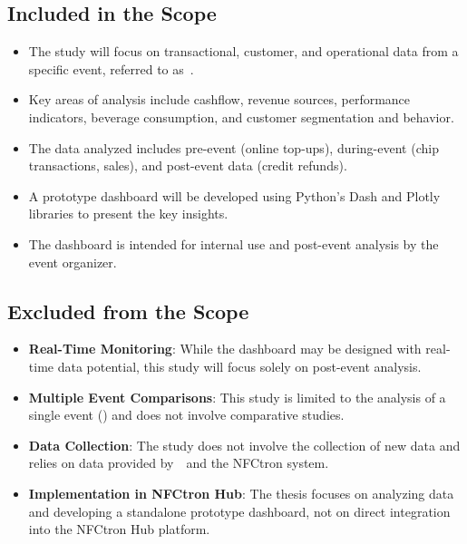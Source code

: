 \subsection*{Included in the Scope}
\label{subsec:introduction-scope-included}
\begin{itemize}
	\item The study will focus on transactional, customer, and operational data from a specific event, referred to as~\theEvent.
	\item Key areas of analysis include cashflow, revenue sources, performance indicators, beverage consumption, and customer segmentation and behavior.
	\item The data analyzed includes pre-event (\eg online top-ups), during-event (\eg chip transactions, sales), and post-event data (\eg credit refunds).
	\item A prototype dashboard will be developed using Python’s Dash and Plotly libraries to present the key insights.
	\item The dashboard is intended for internal use and post-event analysis by the event organizer.
\end{itemize}

\subsection*{Excluded from the Scope}
\label{subsec:introduction-scope-excluded}
\begin{itemize}
	\item \textbf{Real-Time Monitoring}: While the dashboard may be designed with real-time data potential, this study will focus solely on post-event analysis.
	\item \textbf{Multiple Event Comparisons}: This study is limited to the analysis of a single event (\theEvent) and does not involve comparative studies.
	\item \textbf{Data Collection}: The study does not involve the collection of new data and relies on data provided by~\theOrganizer~and the NFCtron system.
	\item \textbf{Implementation in NFCtron Hub}: The thesis focuses on analyzing data and developing a standalone prototype dashboard, not on direct integration into the NFCtron Hub platform.
\end{itemize}

